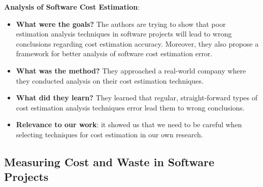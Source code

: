 \documentclass{mprop}
\begin{document}
\textbf{Analysis of Software Cost Estimation}\cite{grimstad2006framework}:
\begin{itemize}
  \item \textbf{What were the goals?}
    The authors are trying to show that poor estimation analysis techniques 
    in software projects will lead to wrong conclusions regarding cost 
    estimation accuracy. Moreover, they also propose a framework for 
    better analysis of software cost estimation error.
  \item \textbf{What was the method?}
    They approached a real-world company where they conducted analysis on
    their cost estimation techniques.
  \item \textbf{What did they learn?}
    They learned that regular, straight-forward types of cost estimation analysis
    techniques error lead them to wrong conclusions. 
  \item \textbf{Relevance to our work}: it showed us that we need to be careful
    when selecting techniques for cost estimation in our own research.
\end{itemize}

\subsection{Measuring Cost and Waste in Software Projects}
\end{document}
